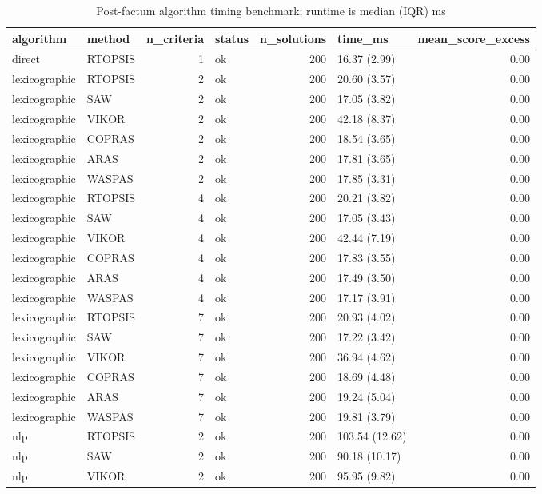 \begin{table}[htbp]
\centering
\caption{Post-factum algorithm timing benchmark; runtime is median (IQR) ms}
\label{tab:e4-benchmark}
\begin{tabular}{llrlrlr}
\toprule
algorithm & method & n\_criteria & status & n\_solutions & time\_ms & mean\_score\_excess \\
\midrule
direct & RTOPSIS & 1 & ok & 200 & 16.37 (2.99) & 0.00 \\
lexicographic & RTOPSIS & 2 & ok & 200 & 20.60 (3.57) & 0.00 \\
lexicographic & SAW & 2 & ok & 200 & 17.05 (3.82) & 0.00 \\
lexicographic & VIKOR & 2 & ok & 200 & 42.18 (8.37) & 0.00 \\
lexicographic & COPRAS & 2 & ok & 200 & 18.54 (3.65) & 0.00 \\
lexicographic & ARAS & 2 & ok & 200 & 17.81 (3.65) & 0.00 \\
lexicographic & WASPAS & 2 & ok & 200 & 17.85 (3.31) & 0.00 \\
lexicographic & RTOPSIS & 4 & ok & 200 & 20.21 (3.82) & 0.00 \\
lexicographic & SAW & 4 & ok & 200 & 17.05 (3.43) & 0.00 \\
lexicographic & VIKOR & 4 & ok & 200 & 42.44 (7.19) & 0.00 \\
lexicographic & COPRAS & 4 & ok & 200 & 17.83 (3.55) & 0.00 \\
lexicographic & ARAS & 4 & ok & 200 & 17.49 (3.50) & 0.00 \\
lexicographic & WASPAS & 4 & ok & 200 & 17.17 (3.91) & 0.00 \\
lexicographic & RTOPSIS & 7 & ok & 200 & 20.93 (4.02) & 0.00 \\
lexicographic & SAW & 7 & ok & 200 & 17.22 (3.42) & 0.00 \\
lexicographic & VIKOR & 7 & ok & 200 & 36.94 (4.62) & 0.00 \\
lexicographic & COPRAS & 7 & ok & 200 & 18.69 (4.48) & 0.00 \\
lexicographic & ARAS & 7 & ok & 200 & 19.24 (5.04) & 0.00 \\
lexicographic & WASPAS & 7 & ok & 200 & 19.81 (3.79) & 0.00 \\
nlp & RTOPSIS & 2 & ok & 200 & 103.54 (12.62) & 0.00 \\
nlp & SAW & 2 & ok & 200 & 90.18 (10.17) & 0.00 \\
nlp & VIKOR & 2 & ok & 200 & 95.95 (9.82) & 0.00 \\

\end{tabular}
\end{table}
